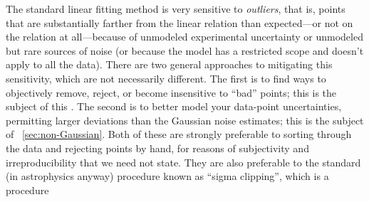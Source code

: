 \documentclass[12pt,twoside,pdftex]{article}
\begin{document}
The standard linear fitting method is very sensitive to
\emph{outliers}, that is, points that are substantially farther from
the linear relation than expected---or not on the relation at
all---because of unmodeled experimental uncertainty or unmodeled but
rare sources of noise (or because the model has a restricted scope and
doesn't apply to all the data).  There are two general approaches to
mitigating this sensitivity, which are not necessarily different.  The
first is to find ways to objectively remove, reject, or become
insensitive to ``bad'' points; this is the subject of
this \sectionname.  The second is to better model your data-point
uncertainties, permitting larger deviations than the Gaussian noise
estimates; this is the subject of
\sectionname~\ref{sec:non-Gaussian}.  Both of these are strongly
preferable to sorting through the data and rejecting points by hand,
for reasons of subjectivity and irreproducibility that we need not
state.  They are also preferable to the standard (in astrophysics
anyway) procedure known as ``sigma clipping'', which is a procedure
\end{document}
